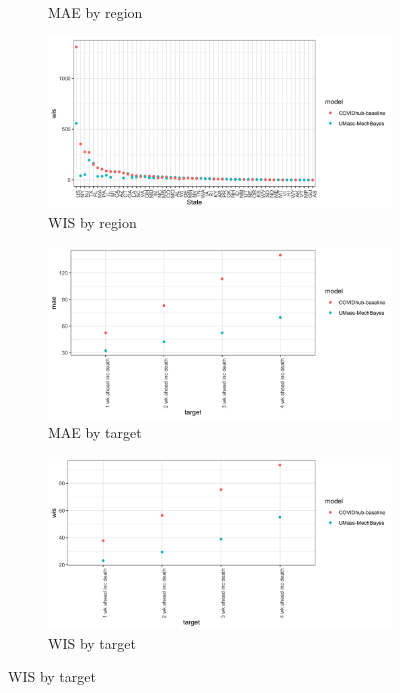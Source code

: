 \documentclass[11pt]{amsart}
\begin{document}
\begin{figure}
\begin{subfigure}{.5\textwidth}
    \caption{MAE by region}
\end{subfigure}%
\begin{subfigure}{.5\textwidth}
  \centering
    \includegraphics[scale=.1]{wis_results_by_region.png}
    \caption{WIS by region}
\end{subfigure}
\begin{subfigure}{.5\textwidth}
  \centering
    \includegraphics[scale=.1]{mae_results_by_target.png}
    \caption{MAE by target}
\end{subfigure}%
\begin{subfigure}{.5\textwidth}
  \centering
    \includegraphics[scale=.1]{wis_results_by_target.png}
    \caption{WIS by target}
\end{subfigure}%

\end{figure}
\end{document}
